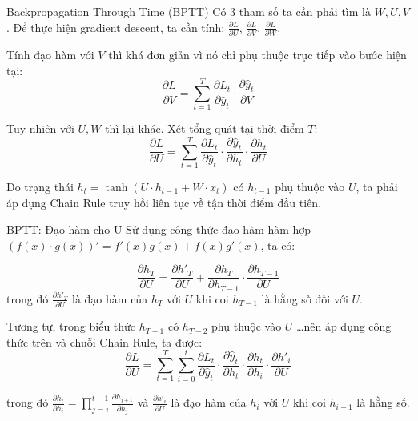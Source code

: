 \documentclass[aspectratio=169, 10pt]{beamer}
\begin{document}
\begin{frame}{Backpropagation Through Time (BPTT)}
\small
Có 3 tham số ta cần phải tìm là $W, U, V$. Để thực hiện gradient descent, ta cần tính: $\frac{\partial L}{\partial U}$, $\frac{\partial L}{\partial V}$, $\frac{\partial L}{\partial W}$.

Tính đạo hàm với $V$ thì khá đơn giản vì nó chỉ phụ thuộc trực tiếp vào bước hiện tại:
\[ \frac{\partial L}{\partial V} = \sum_{t=1}^{T} \frac{\partial L_t}{\partial \hat{y}_t} \cdot \frac{\partial \hat{y}_t}{\partial V} \]

Tuy nhiên với $U, W$ thì lại khác. Xét tổng quát tại thời điểm $T$:
\[ \frac{\partial L}{\partial U} = \sum_{t=1}^{T} \frac{\partial L_t}{\partial \hat{y}_t} \cdot \frac{\partial \hat{y}_t}{\partial h_t} \cdot \frac{\partial h_t}{\partial U} \]

Do trạng thái $h_t = \tanh(U \cdot h_{t-1} + W \cdot x_t)$ có $h_{t-1}$ phụ thuộc vào $U$, ta phải áp dụng Chain Rule truy hồi liên tục về tận thời điểm đầu tiên.
\end{frame}

\begin{frame}{BPTT: Đạo hàm cho U}
\small
Sử dụng công thức đạo hàm hàm hợp $(f(x) \cdot g(x))' = f'(x)g(x) + f(x)g'(x)$, ta có:

\[ \frac{\partial h_T}{\partial U} = \frac{\partial h'_T}{\partial U} + \frac{\partial h_T}{\partial h_{T-1}} \cdot \frac{\partial h_{T-1}}{\partial U} \]
trong đó $\frac{\partial h'_T}{\partial U}$ là đạo hàm của $h_T$ với $U$ khi coi $h_{T-1}$ là hằng số đối với $U$.

Tương tự, trong biểu thức $h_{T-1}$ có $h_{T-2}$ phụ thuộc vào $U$ \dots nên áp dụng công thức trên và chuỗi Chain Rule, ta được:
\[ \frac{\partial L}{\partial U} = \sum_{t=1}^{T} \sum_{i=0}^{t} \frac{\partial L_t}{\partial \hat{y}_t} \cdot \frac{\partial \hat{y}_t}{\partial h_t} \cdot \frac{\partial h_t}{\partial h_i} \cdot \frac{\partial h'_i}{\partial U} \]

trong đó $\frac{\partial h_t}{\partial h_i} = \prod_{j=i}^{t-1} \frac{\partial h_{j+1}}{\partial h_j}$ và $\frac{\partial h'_i}{\partial U}$ là đạo hàm của $h_i$ với $U$ khi coi $h_{i-1}$ là hằng số.
\end{frame}
\end{document}
